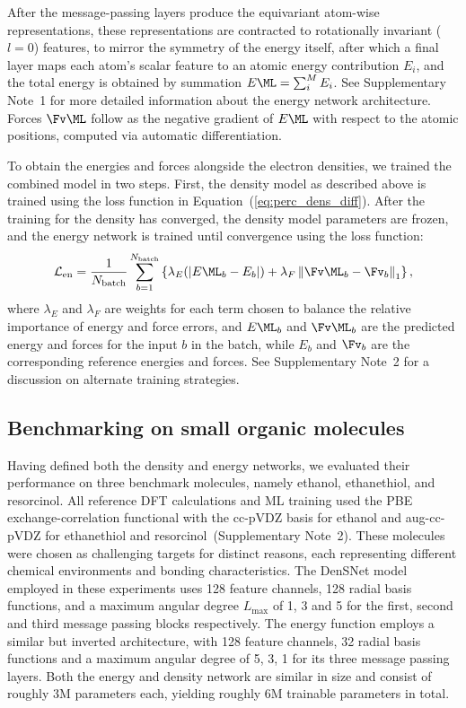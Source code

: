 \documentclass[12pt]{article}
\begin{document}
After the message-passing layers produce the equivariant atom-wise representations, these representations are contracted to rotationally invariant ($l{=}0$) features, to mirror the symmetry of the energy itself, after which a final layer maps each atom's scalar feature to an atomic energy 
contribution $E_i$, and the total energy is obtained by summation $E\ML = \sum_{i}^{M}E_i$. See Supplementary Note~1 for more detailed information about the energy network architecture. 
Forces $\Fv\ML$ follow as the negative gradient of $E\ML$ with respect to the 
atomic positions, computed via automatic differentiation.

To obtain the energies and forces alongside the electron densities, we trained the combined model in two steps. 
First, the density model as described above is trained using the loss function in Equation~(\ref{eq:perc_dens_diff}). 
After the training for the density has converged, the density model parameters are frozen, and the energy network is trained until convergence using the loss function:
\begin{equation}\label{eq:forces_loss}
  \mathcal{L}_{\mathrm{en}} = \frac{1}{N_{\mathrm{batch}}}\sum_{b=1}^{N_{\mathrm{batch}}}\left\{ \lambda_E(|E\ML_b - E_b|) + \lambda_F\left\lVert\Fv\ML_b - \Fv_b\right\rVert_1\right\},
\end{equation}
where $\lambda_E$ and $\lambda_F$ are weights for each term chosen to balance the relative importance of energy and force errors, and $E\ML_b$ and $\Fv\ML_b$ are the predicted energy and forces for the input $b$ in the batch, while $E_b$ and $\Fv_b$ are the corresponding reference energies and forces. See Supplementary Note~2 for a discussion on alternate training strategies.

\subsection{Benchmarking on small organic molecules}\label{sec:benchmark_eval}

Having defined both the density and energy networks, we evaluated their performance on three benchmark molecules, namely ethanol, ethanethiol, and resorcinol. All reference DFT calculations and ML training used the PBE exchange-correlation functional with the cc-pVDZ basis for ethanol and aug-cc-pVDZ for ethanethiol and resorcinol~(Supplementary Note~2). These molecules were chosen as challenging targets for distinct reasons, each representing different chemical environments and bonding characteristics. 
The DenSNet model employed in these experiments uses 128 feature channels, 128 radial basis functions, and a maximum angular degree $L_{\max}$ of 1, 3 and 5 for the first, second and third message passing blocks respectively. The energy function employs a similar but inverted architecture, with 128 feature channels, 32 radial basis functions and a maximum angular degree of 5, 3, 1 for its three message passing layers. Both the energy and density network are similar in size and consist of roughly 3M parameters each, yielding roughly 6M trainable parameters in total.
\end{document}
